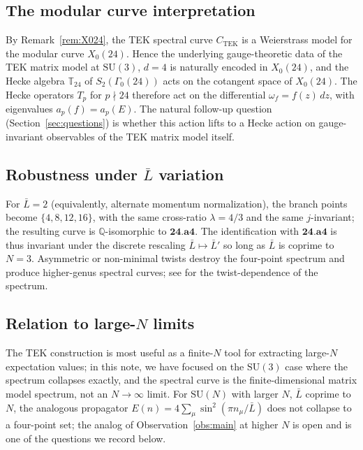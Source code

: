 \documentclass[11pt]{amsart}
\theoremstyle{definition}
\theoremstyle{remark}
\newcommand{\Q}{\mathbb{Q}}
\newcommand{\SU}{\mathrm{SU}}
\newcommand{\TEK}{\mathrm{TEK}}
\begin{document}
\subsection{The modular curve interpretation}

By Remark~\ref{rem:X024}, the TEK spectral curve \(C_{\TEK}\) is a
Weierstrass model for the modular curve \(X_{0}(24)\). Hence the
underlying gauge-theoretic data of the TEK matrix model at
\(\SU(3)\), \(d=4\) is naturally encoded in \(X_{0}(24)\), and the
Hecke algebra \(\mathbb{T}_{24}\) of \(S_{2}(\Gamma_{0}(24))\) acts
on the cotangent space of \(X_{0}(24)\). The Hecke operators
\(T_{p}\) for \(p \nmid 24\) therefore act on the differential
\(\omega_{f} = f(z)\,dz\), with eigenvalues \(a_{p}(f) = a_{p}(E)\).
The natural follow-up question (Section~\ref{sec:questions}) is
whether this action lifts to a Hecke action on gauge-invariant
observables of the TEK matrix model itself.

\subsection{Robustness under \(\bar L\) variation}

For \(\bar L = 2\) (equivalently, alternate momentum normalization),
the branch points become \(\{4, 8, 12, 16\}\), with the same
cross-ratio \(\lambda = 4/3\) and the same \(j\)-invariant; the
resulting curve is \(\Q\)-isomorphic to \(\mathbf{24.a4}\). The
identification with \(\mathbf{24.a4}\) is thus invariant under the
discrete rescaling \(\bar L \mapsto \bar L'\) so long as \(\bar L\)
is coprime to \(N = 3\). Asymmetric or non-minimal twists destroy
the four-point spectrum and produce higher-genus spectral curves;
see \cite{CosterLucini2002, BringoltzSharpe2008} for the
twist-dependence of the spectrum.

\subsection{Relation to large-\(N\) limits}

The TEK construction is most useful as a finite-\(N\) tool for
extracting large-\(N\) expectation values; in this note, we have
focused on the \(\SU(3)\) case where the spectrum collapses
exactly, and the spectral curve is the finite-dimensional matrix
model spectrum, not an \(N \to \infty\) limit. For \(\SU(N)\) with
larger \(N\), \(\bar L\) coprime to \(N\), the analogous propagator
\(E(n) = 4 \sum_{\mu}\sin^{2}(\pi n_{\mu}/\bar L)\) does not
collapse to a four-point set; the analog of Observation~\ref{obs:main}
at higher \(N\) is open and is one of the questions we record below.
\end{document}
